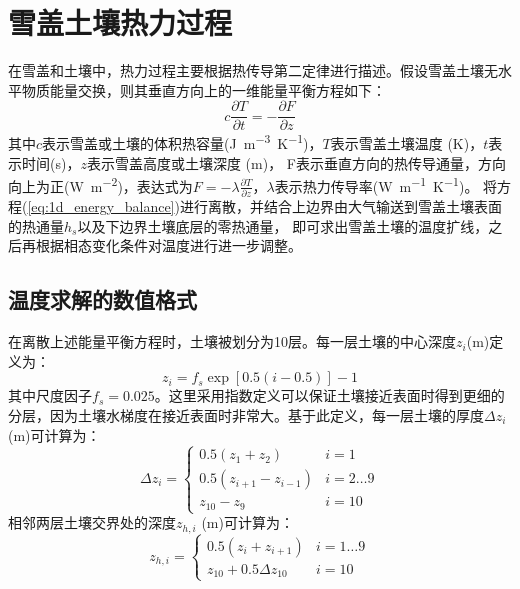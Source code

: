 \chapter{雪盖土壤热力过程}


在雪盖和土壤中，热力过程主要根据热传导第二定律进行描述。假设雪盖土壤无水平物质能量交换，则其垂直方向上的一维能量平衡方程如下：
\begin{equation}\label{eq:1d_energy_balance}
c \frac{\partial T}{\partial t}=-\frac{\partial F}{\partial z}
\end{equation}
其中$c$表示雪盖或土壤的体积热容量(\unit{J.m^{-3}.K^{-1}})，$T$表示雪盖土壤温度 (K)，$t$表示时间(s)，$z$表示雪盖高度或土壤深度 (m)，
F表示垂直方向的热传导通量，方向向上为正(\unit{W.m^{-2}})，表达式为$F=-\lambda\frac{\partial T}{\partial z}$，$\lambda$表示热力传导率(\unit{W.m^{-1}.K^{-1}})。
将方程(\ref{eq:1d_energy_balance})进行离散，并结合上边界由大气输送到雪盖土壤表面的热通量$h_s$以及下边界土壤底层的零热通量，
即可求出雪盖土壤的温度扩线，之后再根据相态变化条件对温度进行进一步调整。


\section{温度求解的数值格式}\label{温度求解的数值格式}
在离散上述能量平衡方程时，土壤被划分为10层。每一层土壤的中心深度$z_i$(m)定义为：
\begin{equation}
z_{i}=f_{s} \exp [0.5(i-0.5)]-1
\end{equation}
%
其中尺度因子$f_s=0.025$。这里采用指数定义可以保证土壤接近表面时得到更细的分层，因为土壤水梯度在接近表面时非常大。基于此定义，每一层土壤的厚度$\Delta z_i$ (m)可计算为：
\begin{equation}
\Delta z_{i}=\left\{\begin{array}{ll}0.5\left(z_{1}+z_{2}\right) & i=1 \\ 0.5\left(z_{i+1}-z_{i-1}\right) & i=2 \ldots 9 \\ z_{10}-z_{9} & i=10\end{array}\right.
\end{equation}
相邻两层土壤交界处的深度$z_{h,i}$ (m)可计算为：
\begin{equation}
z_{h, i}=\left\{\begin{array}{ll}0.5\left(z_{i}+z_{i+1}\right) & i=1 \ldots 9 \\ z_{10}+0.5 \Delta z_{10} & i=10\end{array}\right.
\end{equation}



